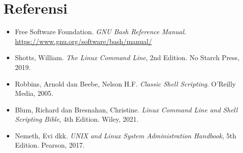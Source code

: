 \section{Referensi}
\label{sec:referensi-bash-shell}

\begin{itemize}
    \item Free Software Foundation. \textit{GNU Bash Reference Manual}.
          \url{https://www.gnu.org/software/bash/manual/}
    \item Shotts, William. \textit{The Linux Command Line}, 2nd Edition.
          No Starch Press, 2019.
    \item Robbins, Arnold dan Beebe, Nelson H.F. \textit{Classic Shell
          Scripting}. O'Reilly Media, 2005.
    \item Blum, Richard dan Bresnahan, Christine. \textit{Linux Command
          Line and Shell Scripting Bible}, 4th Edition. Wiley, 2021.
    \item Nemeth, Evi dkk. \textit{UNIX and Linux System Administration
          Handbook}, 5th Edition. Pearson, 2017.
\end{itemize}
